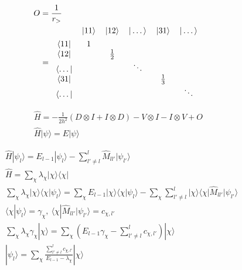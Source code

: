 \documentclass{article}
\begin{document}
\begin{align*}
  O&=\frac{1}{r_>}\\
  &=\begin{tabular}{c @{\hspace{2\tabcolsep}} *{5}{c}}
  &
  \itshape $|11\rangle$ &
  \itshape $|12\rangle$ &
    \itshape $|\dots\rangle$ &
    \itshape $|31\rangle$ & 
  \itshape $|\dots\rangle$ 
\\[1ex]
    \bfseries $\langle 11 |$& 1 & & & &\\
    \bfseries $\langle 12 |$& & $\frac{1}{2}$ & & &\\
    \bfseries $\langle \dots |$& & & $\ddots$ & &\\
    \bfseries $\langle 31 |$& & & & $\frac{1}{3}$ &\\
    \bfseries $\langle \dots |$& & & & & $\ddots$
  \end{tabular}
\end{align*}

\begin{align*}
  \hat{H}=-\frac{1}{2h^2}(D\otimes I + I\otimes D) - V\otimes I -I\otimes V + O\\
  \hat{H}|\psi\rangle=E|\psi\rangle
\end{align*}

\begin{align*}
  &\hat{H}|\psi_l\rangle=E_{l-1}|\psi_l\rangle - \sum_{l'\neq l}^l\hat{M}_{ll'}|\psi_{l'}\rangle\\
  &\hat{H} = \sum_\chi\lambda_\chi|\chi\rangle\langle\chi|\\
  &\sum_\chi \lambda_\chi|\chi\rangle\langle\chi|\psi_l\rangle=\sum_\chi E_{l-1}|\chi\rangle\langle\chi|\psi_l\rangle - \sum_\chi\sum_{l'\neq l}^l|\chi\rangle\langle\chi|\hat{M}_{ll'}|\psi_{l'}\rangle\\
  &\langle\chi|\psi_l\rangle=\gamma_\chi,\ \langle\chi|\hat{M}_{ll'}|\psi_{l'}\rangle=c_{\chi,l'}\\
  &\sum_\chi \lambda_\chi\gamma_\chi|\chi\rangle=\sum_\chi (E_{l-1}\gamma_\chi - \sum_{l'\neq l}^lc_{\chi,l'})|\chi\rangle\\
  &|\psi_l\rangle=\sum_\chi\frac{\sum_{l'\neq l}^lc_{\chi,l'}}{E_{l-1}-\lambda_\chi}|\chi\rangle
\end{align*}
\end{document}
